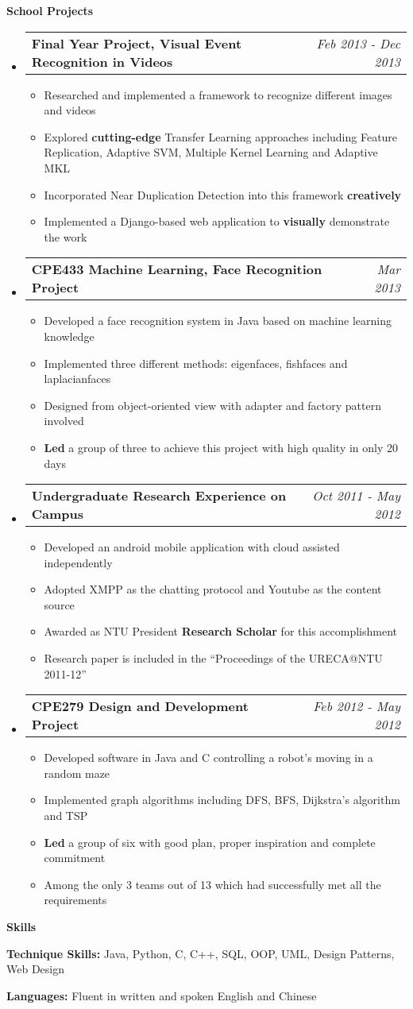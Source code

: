 \documentclass[a4paper,12pt]{article}
\makeatletter
\newcommand{\resitem}[1]{\item #1 \vspace{-2pt}}
\newcommand{\resheading}[1]{{\large {\begin{minipage}{\textwidth}{\textbf{#1 \vphantom{p\^{E}}}}\end{minipage}}}}
\newcommand{\projectsubheading}[2]{
\begin{tabular*}{6.3in}{l@{\extracolsep{\fill}}r}
		\textbf{#1} & \textit{#2} \\
\end{tabular*}\vspace{-6pt}}
\makeatother
\begin{document}
\resheading {School Projects}
\begin{itemize}
\item
	\projectsubheading {Final Year Project, Visual Event Recognition in Videos}{Feb 2013 - Dec 2013}
	\begin{itemize}
		\resitem {Researched and implemented a framework to recognize different images and videos}
		\resitem {Explored \textbf{cutting-edge} Transfer Learning approaches including Feature Replication, Adaptive SVM, Multiple Kernel Learning and Adaptive MKL}
		\resitem {Incorporated Near Duplication Detection into this framework \textbf{creatively}}

		\resitem {Implemented a Django-based web application to \textbf{visually} demonstrate the work}

	\end{itemize}

\item
	\projectsubheading {CPE433 Machine Learning, Face Recognition Project}{Mar 2013}
	\begin{itemize}
		\resitem {Developed a face recognition system in Java based on machine learning knowledge}
		\resitem {Implemented three different methods: eigenfaces, fishfaces and laplacianfaces}
		\resitem {Designed from object-oriented view with adapter and factory pattern involved}
		\resitem {\textbf{Led} a group of three to achieve this project with high quality in only 20 days}
	\end{itemize}
\item
	\projectsubheading {Undergraduate Research Experience on Campus} {Oct 2011 - May 2012}

	\begin{itemize}
		\resitem {Developed an android mobile application with cloud assisted independently}
		\resitem {Adopted XMPP as the chatting protocol and Youtube as the content source}
		\resitem {Awarded as NTU President \textbf{Research Scholar} for this accomplishment}
		\resitem{ Research paper is included in the ``Proceedings of the URECA@NTU 2011-12''}
	\end{itemize}
\item
	\projectsubheading {CPE279 Design and Development Project}{Feb 2012 - May 2012}

	\begin{itemize}
		\resitem {Developed software in Java and C controlling a robot's moving in a random maze}
		\resitem {Implemented graph algorithms including DFS, BFS, Dijkstra's algorithm and TSP}
		\resitem {\textbf{Led} a group of six with good plan, proper inspiration and complete commitment}
		\resitem {Among the only 3 teams out of 13 which had successfully met all the requirements}
	\end{itemize}
\end{itemize}

\resheading{Skills}
\begin{description}
\item{\bf Technique Skills: }Java, Python, C, C++, SQL, OOP, UML, Design Patterns, Web Design

\item{\bf Languages: }Fluent in written and spoken English and Chinese
\end{description}
\end{document}
